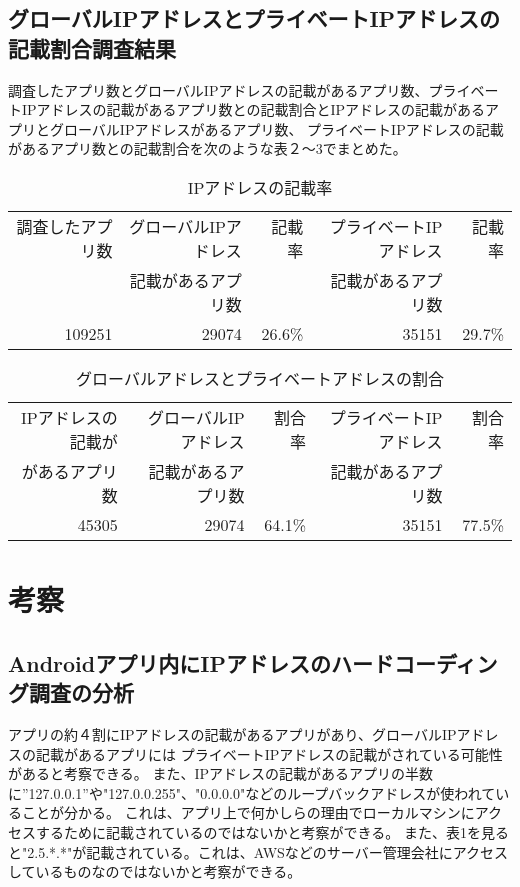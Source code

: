 \documentclass[a4j]{jarticle}
\begin{document}
\newpage

\subsection{グローバルIPアドレスとプライベートIPアドレスの記載割合調査結果}

調査したアプリ数とグローバルIPアドレスの記載があるアプリ数、プライベートIPアドレスの記載があるアプリ数との記載割合とIPアドレスの記載があるアプリとグローバルIPアドレスがあるアプリ数、
プライベートIPアドレスの記載があるアプリ数との記載割合を次のような表２〜3でまとめた。

\begin{table}[htb]
\begin{center}
	\caption{IPアドレスの記載率}
	\begin{tabular}{|r|r|r|r|r|}

	\hline
	調査したアプリ数 & グローバルIPアドレス & 記載率 & プライベートIPアドレス&記載率 \\
	&記載があるアプリ数 & &記載があるアプリ数 &\\
	\hline
		109251 & 29074 & 26.6\% & 35151&29.7\% \\
	\hline
	\end{tabular}
	\end{center}
\end{table}

\begin{table}[htb]
	\begin{center}
		\caption{グローバルアドレスとプライベートアドレスの割合}
		\begin{tabular}{|r|r|r|r|r|}
	
		\hline
		IPアドレスの記載が& グローバルIPアドレス & 割合率 & プライベートIPアドレス&割合率 \\
		があるアプリ数&記載があるアプリ数 & &記載があるアプリ数 &\\
		\hline
			45305 & 29074 & 64.1\% & 35151&77.5\% \\
		\hline
		\end{tabular}
		\end{center}
	\end{table}


\newpage
\section{考察}
\subsection{Androidアプリ内にIPアドレスのハードコーディング調査の分析}
アプリの約４割にIPアドレスの記載があるアプリがあり、グローバルIPアドレスの記載があるアプリには
プライベートIPアドレスの記載がされている可能性があると考察できる。
また、IPアドレスの記載があるアプリの半数に”127.0.0.1”や"127.0.0.255"、"0.0.0.0"などのループバックアドレスが使われていることが分かる。
これは、アプリ上で何かしらの理由でローカルマシンにアクセスするために記載されているのではないかと考察ができる。
また、表1を見ると"2.5.*.*"が記載されている。これは、AWSなどのサーバー管理会社にアクセスしているものなのではないかと考察ができる。
\end{document}
